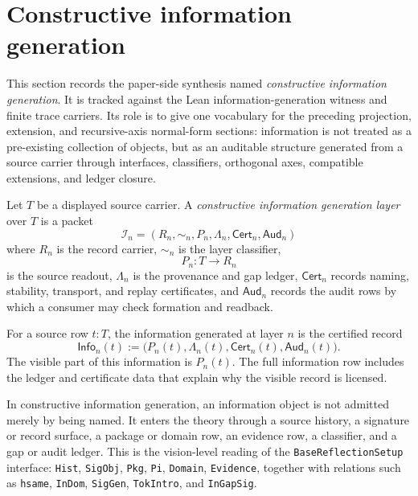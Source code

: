 \section{Constructive information generation}
\label{sec:constructive-information-generation}

\begin{remark}
\label{rem:constructive-information-generation-status}
This section records the paper-side synthesis named
\emph{constructive information generation}. It is tracked against the Lean
information-generation witness and finite trace carriers. Its role is to give
one vocabulary for the preceding projection, extension, and recursive-axis normal-form sections:
information is not treated as a pre-existing collection of objects, but
as an auditable structure generated from a source carrier through
interfaces, classifiers, orthogonal axes, compatible extensions, and
ledger closure.
\end{remark}

\begin{definition}
\label{def:constructive-information-generation-layer}
Let $T$ be a displayed source carrier. A \emph{constructive information
generation layer} over $T$ is a packet
$$
\mathcal I_n
=
(R_n,\sim_n,P_n,\Lambda_n,\mathsf{Cert}_n,\mathsf{Aud}_n)
$$
where $R_n$ is the record carrier, $\sim_n$ is the layer classifier,
$$
P_n:T\to R_n
$$
is the source readout, $\Lambda_n$ is the provenance and gap ledger,
$\mathsf{Cert}_n$ records naming, stability, transport, and replay
certificates, and $\mathsf{Aud}_n$ records the audit rows by which a
consumer may check formation and readback.
\end{definition}

\begin{definition}
\label{def:layer-generated-information}
For a source row $t:T$, the information generated at layer $n$ is the
certified record
$$
\mathsf{Info}_n(t)
:=
\bigl(P_n(t),\Lambda_n(t),\mathsf{Cert}_n(t),\mathsf{Aud}_n(t)\bigr).
$$
The visible part of this information is $P_n(t)$. The full information
row includes the ledger and certificate data that explain why the
visible record is licensed.
\end{definition}

\begin{principle}
\label{prin:no-bare-information-objects}
In constructive information generation, an information object is not
admitted merely by being named. It enters the theory through a source
history, a signature or record surface, a package or domain row, an
evidence row, a classifier, and a gap or audit ledger. This is the
vision-level reading of the \texttt{BaseReflectionSetup} interface:
\texttt{Hist}, \texttt{SigObj}, \texttt{Pkg}, \texttt{Pi},
\texttt{Domain}, \texttt{Evidence}, together with relations such as
\texttt{hsame}, \texttt{InDom}, \texttt{SigGen},
\texttt{TokIntro}, and \texttt{InGapSig}.
\end{principle}

